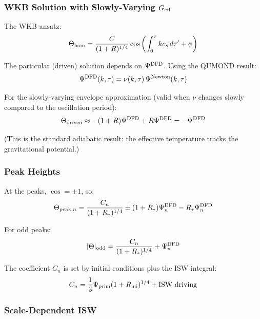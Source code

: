 \documentclass[11pt,a4paper]{article}
\begin{document}
\subsubsection{WKB Solution with Slowly-Varying $G_{\rm eff}$}

The WKB ansatz:
\begin{equation}
\Theta_{\rm hom} = \frac{C}{(1+R)^{1/4}}\cos\left(\int_0^\tau kc_s\,d\tau' + \phi\right)
\end{equation}

The particular (driven) solution depends on $\Psi^{\rm DFD}$. Using the QUMOND result:
\begin{equation}
\Psi^{\rm DFD}(k, \tau) = \nu(k, \tau)\,\Psi^{\rm Newton}(k, \tau)
\end{equation}

For the slowly-varying envelope approximation (valid when $\nu$ changes slowly compared to the oscillation period):
\begin{equation}
\Theta_{\rm driven} \approx -(1+R)\Psi^{\rm DFD} + R\Psi^{\rm DFD} = -\Psi^{\rm DFD}
\end{equation}

(This is the standard adiabatic result: the effective temperature tracks the gravitational potential.)

\subsubsection{Peak Heights}

At the peaks, $\cos = \pm 1$, so:
\begin{equation}
\Theta_{{\rm peak},n} = \frac{C_n}{(1+R_*)^{1/4}} \pm (1+R_*)\Psi^{\rm DFD}_n - R_*\Psi^{\rm DFD}_n
\end{equation}

For odd peaks:
\begin{equation}
|\Theta|_{{\rm odd}} = \frac{C_n}{(1+R_*)^{1/4}} + \Psi^{\rm DFD}_n
\end{equation}

The coefficient $C_n$ is set by initial conditions plus the ISW integral:
\begin{equation}
C_n = \frac{1}{3}\Psi_{\rm prim}(1+R_{\rm ini})^{1/4} + \text{ISW driving}
\end{equation}

\subsubsection{Scale-Dependent ISW}
\end{document}
